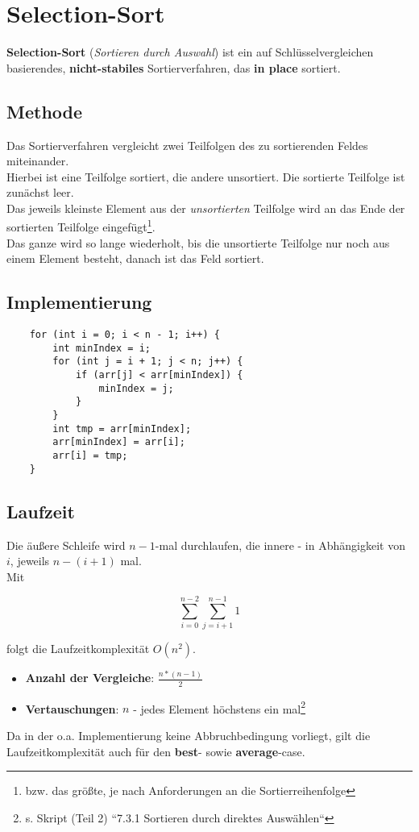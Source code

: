 \section{Selection-Sort}

\textbf{Selection-Sort} (\textit{Sortieren durch Auswahl}) ist ein auf Schlüsselvergleichen basierendes, \textbf{nicht-stabiles} Sortierverfahren, das \textbf{in place} sortiert.

\subsection{Methode}
Das Sortierverfahren vergleicht zwei Teilfolgen des zu sortierenden Feldes miteinander.\\
Hierbei ist eine Teilfolge sortiert, die andere unsortiert.
Die sortierte Teilfolge ist zunächst leer.\\
Das jeweils kleinste Element aus der \textit{unsortierten} Teilfolge wird an das Ende der sortierten Teilfolge eingefügt\footnote{bzw. das größte, je nach Anforderungen an die Sortierreihenfolge}.\\
Das ganze wird so lange wiederholt, bis die unsortierte Teilfolge nur noch aus einem Element besteht, danach ist das Feld sortiert.


\subsection{Implementierung}

\begin{verbatim}
    for (int i = 0; i < n - 1; i++) {
        int minIndex = i;
        for (int j = i + 1; j < n; j++) {
            if (arr[j] < arr[minIndex]) {
                minIndex = j;
            }
        }
        int tmp = arr[minIndex];
        arr[minIndex] = arr[i];
        arr[i] = tmp;
    }
\end{verbatim}


\subsection{Laufzeit}
Die äußere Schleife wird $n - 1$-mal durchlaufen, die innere - in Abhängigkeit von $i$, jeweils $n - (i + 1)$ mal.\\
Mit

\begin{equation}
    \sum_{i=0}^{n-2} \sum_{j = i + 1}^{n - 1} 1
\end{equation}

\noindent
folgt die Laufzeitkomplexität $O(n^2)$.\\

\begin{itemize}
    \item \textbf{Anzahl der Vergleiche}: $\frac{n * ( n - 1)}{2}$
    \item \textbf{Vertauschungen}: $n$ - jedes Element höchstens ein mal\footnote{s. Skript (Teil 2) ``7.3.1 Sortieren durch direktes Auswählen``
    }
\end{itemize}

\noindent
Da in der o.a. Implementierung keine Abbruchbedingung vorliegt, gilt die Laufzeitkomplexität auch für den \textbf{best}- sowie \textbf{average}-case.

